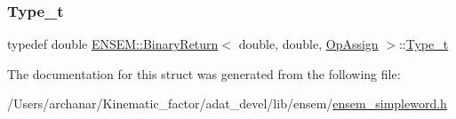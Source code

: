 \mbox{\label{structENSEM_1_1BinaryReturn_3_01double_00_01double_00_01OpAssign_01_4_a69cfbbe6186e9203aee261817f4b3dbd}} 
\subsubsection{\texorpdfstring{Type\_t}{Type\_t}\hspace{0.1cm}{\footnotesize\ttfamily [2/2]}}
{\footnotesize\ttfamily typedef double \mbox{\hyperlink{structENSEM_1_1BinaryReturn}{E\+N\+S\+E\+M\+::\+Binary\+Return}}$<$ double, double, \mbox{\hyperlink{structENSEM_1_1OpAssign}{Op\+Assign}} $>$\+::\mbox{\hyperlink{structENSEM_1_1BinaryReturn_3_01double_00_01double_00_01OpAssign_01_4_a69cfbbe6186e9203aee261817f4b3dbd}{Type\+\_\+t}}}



The documentation for this struct was generated from the following file\+:\begin{DoxyCompactItemize}
\item 
/\+Users/archanar/\+Kinematic\+\_\+factor/adat\+\_\+devel/lib/ensem/\mbox{\hyperlink{lib_2ensem_2ensem__simpleword_8h}{ensem\+\_\+simpleword.\+h}}\end{DoxyCompactItemize}
